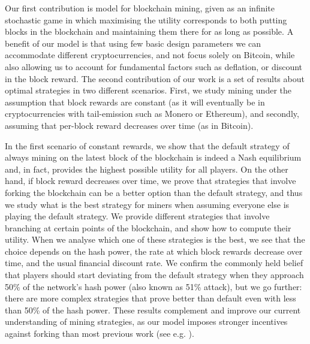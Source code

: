 \smallskip
{}  Our first contribution 
is model for blockchain mining, given as an infinite stochastic game in which maximising the utility corresponds to both 
putting blocks in the blockchain and maintaining them there for as long as possible. A
benefit of our model is that using few basic design parameters we can 
accommodate different cryptocurrencies, and not focus solely on Bitcoin,
while also allowing us to account for fundamental factors such as deflation, or discount in the block reward. 
The second contribution of our work is a set of results about optimal strategies in two different scenarios. First, 
we study mining under the assumption that block rewards are constant (as it will eventually be in cryptocurrencies with tail-emission such as Monero or Ethereum), and secondly, assuming that per-block reward decreases over time (as in Bitcoin). 

In the first scenario of constant rewards, we show that the default strategy of always mining on the latest block of the blockchain is indeed a Nash equilibrium and, in fact, 
provides the highest possible utility for all players. 
On the other hand, if block reward decreases over time, we prove that strategies that involve forking the blockchain
can be a better option than the default strategy, and thus we study what is the best strategy for miners when assuming everyone else 
is playing the default strategy. We provide different strategies that involve branching at certain points of the blockchain, and show how to compute their 
utility. When we analyse which one of these strategies is the best, we see that the choice depends on the hash power, the rate at which 
block rewards decrease over time, and the usual financial discount rate. We confirm the commonly held belief that
players should start deviating from the default strategy 
when they approach 50\% of the network's hash power (also known as 51\% attack), but we go further: there are more complex strategies that 
prove better than default even with less than 50\% of the hash power. These results complement and improve our current understanding of mining strategies, 
as our model imposes stronger 
incentives against forking than 
most previous work (see e.g. \cite{mininggames:2016,biais2018blockchain}).

